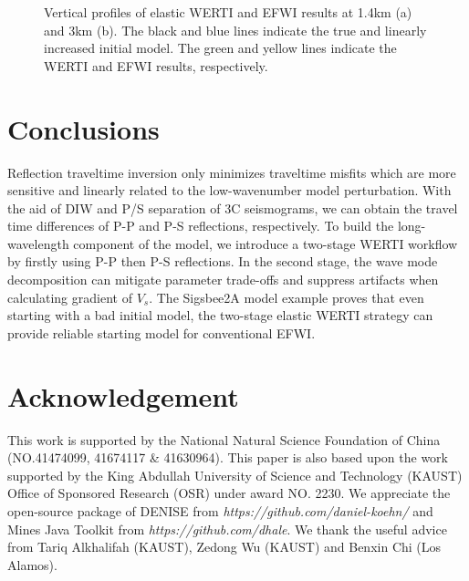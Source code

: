 \begin{figure}[!htb]
   \centering
   \caption{Vertical profiles of elastic WERTI and EFWI results at 1.4km (a) and
	   3km (b). The black and blue lines indicate the true and linearly increased
	   initial model. The green and yellow lines indicate the WERTI and EFWI results,
	   respectively.
   }
   \label{fig:Profiles}
\end{figure}
\section{Conclusions}
Reflection traveltime inversion only minimizes traveltime misfits which are more sensitive
and linearly related to the low-wavenumber model perturbation. With the aid of DIW and
P/S separation of 3C seismograms, we can obtain the travel time differences of P-P and P-S
reflections, respectively. 
To build the long-wavelength component of the model, we introduce a two-stage WERTI
workflow by firstly using P-P then P-S reflections. In the second stage, the wave mode
decomposition can mitigate parameter trade-offs and suppress artifacts when
calculating gradient of $V_s$.
The Sigsbee2A model example proves that even starting with a bad initial model, the
two-stage elastic WERTI strategy can provide reliable starting model for conventional EFWI. 

\section{Acknowledgement}
This work is supported by the
National Natural Science Foundation of China (NO.41474099, 41674117 \& 41630964). 
This paper is also based upon the work supported by the King Abdullah University of Science
and Technology (KAUST) Office of Sponsored Research (OSR) under award NO. 2230.
We appreciate the open-source package of DENISE from
\textit{https://github.com/daniel-koehn/} and Mines Java Toolkit from
\textit{https://github.com/dhale}.
We thank the useful advice from Tariq Alkhalifah (KAUST), Zedong Wu (KAUST) and Benxin Chi (Los Alamos).


